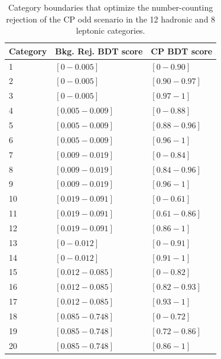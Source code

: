 \begin{table}[ht]
\begin{center}
\begin{tabular}{lll}
Category & Bkg. Rej. BDT score & CP BDT score \\ \hline
1 & $\left[0 - 0.005\right]$ & $\left[0 - 0.90\right]$ \\
2 & $\left[0 - 0.005\right]$ & $\left[0.90 - 0.97\right]$ \\
3 & $\left[0 - 0.005\right]$ & $\left[0.97 - 1 \right]$ \\
4 & $\left[0.005 - 0.009\right]$ & $\left[0 - 0.88 \right]$ \\
5 & $\left[0.005 - 0.009\right]$ & $\left[0.88 - 0.96\right]$ \\
6 & $\left[0.005 - 0.009\right]$ & $\left[0.96 - 1\right]$ \\
7 & $\left[0.009 - 0.019\right]$ & $\left[0 - 0.84 \right]$ \\
8 & $\left[0.009 - 0.019\right]$ & $\left[0.84 - 0.96\right]$ \\
9 & $\left[0.009 - 0.019\right]$ & $\left[0.96 - 1\right]$ \\
10 & $\left[0.019 - 0.091\right]$ & $\left[0 - 0.61 \right]$ \\
11 & $\left[0.019 - 0.091 \right]$ & $\left[0.61 - 0.86\right]$ \\
12 & $\left[0.019 - 0.091 \right]$ & $\left[0.86 - 1\right]$ \\ \hline
13 & $\left[0 - 0.012\right]$ & $\left[0 - 0.91 \right]$ \\
14 & $\left[0 - 0.012 \right]$ & $\left[0.91 - 1\right]$ \\
15 & $\left[0.012 - 0.085\right]$ & $\left[0 - 0.82\right]$ \\
16 & $\left[0.012 - 0.085\right]$ & $\left[0.82 - 0.93 \right]$ \\
17 & $\left[0.012 - 0.085\right]$ & $\left[0.93 - 1\right]$ \\
18 & $\left[0.085 - 0.748\right]$ & $\left[0 - 0.72\right]$ \\
19 & $\left[0.085 - 0.748\right]$ & $\left[0.72 - 0.86\right]$ \\
20 & $\left[0.085 - 0.748\right]$ & $\left[0.86 - 1 \right]$ \\  \hline
\hline
\end{tabular}
\end{center}
\vspace{-0.5cm}
\caption{Category boundaries that optimize the number-counting rejection of the CP odd scenario in the 12 hadronic and 8 leptonic categories.}
\label{tab:boundaries}
\end{table}

